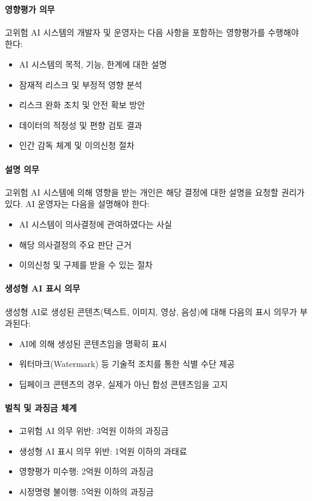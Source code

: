\paragraph{영향평가 의무}
고위험 AI 시스템의 개발자 및 운영자는 다음 사항을 포함하는 영향평가를 수행해야 한다:
\begin{itemize}
 \item AI 시스템의 목적, 기능, 한계에 대한 설명
 \item 잠재적 리스크 및 부정적 영향 분석
 \item 리스크 완화 조치 및 안전 확보 방안
 \item 데이터의 적정성 및 편향 검토 결과
 \item 인간 감독 체계 및 이의신청 절차
\end{itemize}

\paragraph{설명 의무}
고위험 AI 시스템에 의해 영향을 받는 개인은 해당 결정에 대한 설명을 요청할 권리가 있다. AI 운영자는 다음을 설명해야 한다:
\begin{itemize}
 \item AI 시스템이 의사결정에 관여하였다는 사실
 \item 해당 의사결정의 주요 판단 근거
 \item 이의신청 및 구제를 받을 수 있는 절차
\end{itemize}

\paragraph{생성형 AI 표시 의무}
생성형 AI로 생성된 콘텐츠(텍스트, 이미지, 영상, 음성)에 대해 다음의 표시 의무가 부과된다:
\begin{itemize}
 \item AI에 의해 생성된 콘텐츠임을 명확히 표시
 \item 워터마크(Watermark) 등 기술적 조치를 통한 식별 수단 제공
 \item 딥페이크 콘텐츠의 경우, 실제가 아닌 합성 콘텐츠임을 고지
\end{itemize}

\paragraph{벌칙 및 과징금 체계}
\begin{itemize}
 \item 고위험 AI 의무 위반: 3억원 이하의 과징금
 \item 생성형 AI 표시 의무 위반: 1억원 이하의 과태료
 \item 영향평가 미수행: 2억원 이하의 과징금
 \item 시정명령 불이행: 5억원 이하의 과징금
\end{itemize}

